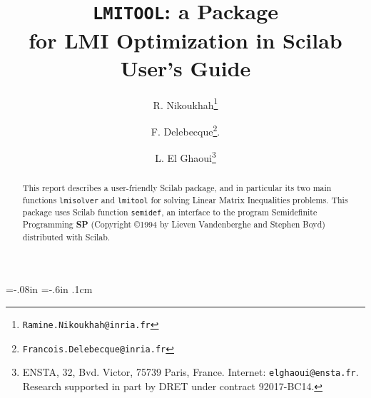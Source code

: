 \textwidth=6.65in
\textheight=9.5in 
\oddsidemargin=-.08in
\evensidemargin=0in
\topmargin=-.6in
\parskip.1cm


\def\lmitool{{\tt LMITOOL}}
\def\dsp{\displaystyle}
\def\reals{{\bf R}}
\def\BEQ{\begin{equation}}
\def\EEQ{\end{equation}}
\def\eg{{\em e.g.}}
\def\ie{{\em i.e.}}
\def\Tr{{\mathop{\bf Tr}}}
\def\diag{{\mathop{\bf diag}}}
\def\eqbydef{\mathrel{\stackrel{\Delta}{=}}}

\title{\lmitool:
a Package \\ for LMI Optimization in Scilab\\[0.5in]
User's Guide}
\date{}
\author{R. Nikoukhah\thanks{{\tt Ramine.Nikoukhah@inria.fr}}
\and
F. Delebecque\thanks{\tt Francois.Delebecque@inria.fr}.  
\and
L. El Ghaoui\thanks{ENSTA, 32, Bvd. Victor, 75739 Paris, France.
Internet: {\tt elghaoui@ensta.fr}.  Research supported in part by DRET
under contract  92017-BC14.}
}

\maketitle

\begin{abstract}
This report describes a user-friendly Scilab package, and in
particular its two main functions {\tt lmisolver} and
{\tt lmitool} for solving
Linear Matrix Inequalities problems.  This package
uses Scilab function {\tt semidef}, an interface to the program 
Semidefinite Programming {\bf SP} (Copyright \copyright 1994 by Lieven
Vandenberghe and Stephen Boyd) distributed with Scilab. 
\end{abstract}

\tableofcontents

\newpage

